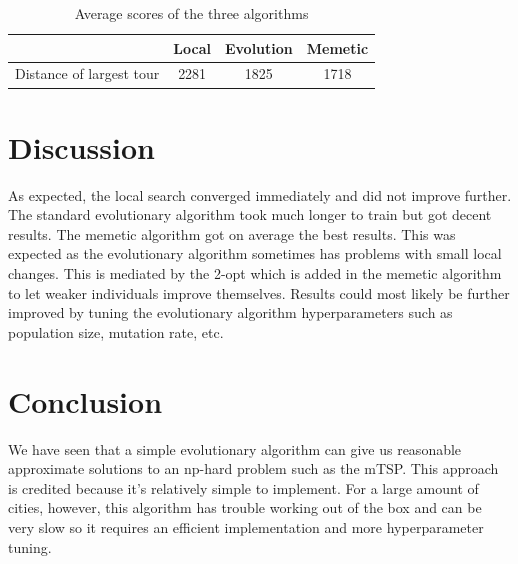 \documentclass[journal]{IEEEtrancz}
\begin{document}
\begin{table}
  \centering
  \caption{Average scores of the three algorithms}
  \begin{tabular}{|l||c|c|c|}
  \hline
    & Local & Evolution & Memetic \\
  \hline
  \hline
  Distance of largest tour  & 2281 & 1825 & 1718 \\
  \hline
  \end{tabular}
  \label{tab:extab}
\end{table}


\section{Discussion}
As expected, the local search converged immediately and did not improve further. The standard evolutionary algorithm took much longer to train but got decent results. The memetic algorithm got on average the best results. This was expected as the evolutionary algorithm sometimes has problems with small local changes. This is mediated by the 2-opt which is added in the memetic algorithm to let weaker individuals improve themselves.
Results could most likely be further improved by tuning the evolutionary algorithm hyperparameters such as population size, mutation rate, etc. 

\section{Conclusion}
We have seen that a simple evolutionary algorithm can give us reasonable approximate solutions to an np-hard problem such as the mTSP. This approach is credited because it's relatively simple to implement. For a large amount of cities, however, this algorithm has trouble working out of the box and can be very slow so it requires an efficient implementation and more hyperparameter tuning.
\end{document}
